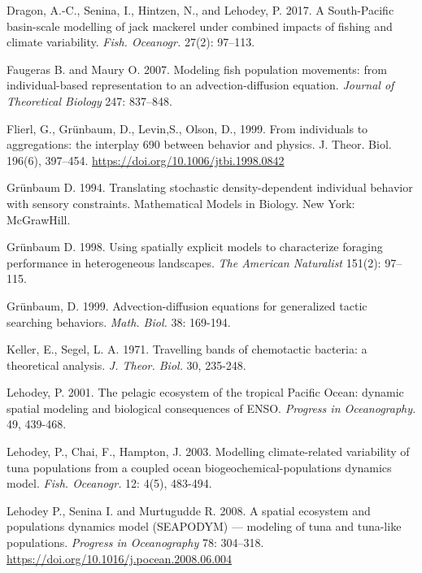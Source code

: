 \begin{thebibliography}{}
 Dragon, A.-C., Senina, I., Hintzen, N., and Lehodey, P. 2017. A South-Pacific basin-scale modelling of jack mackerel under combined impacts of fishing and climate variability. \textit{Fish. Oceanogr.} 27(2): 97–113.

 Faugeras B. and Maury O. 2007. Modeling fish population movements: from individual-based representation to an advection-diffusion equation. \textit {Journal of Theoretical Biology} 247: 837–848.

  Flierl, G., Grünbaum, D., Levin,S., Olson, D., 1999. From individuals to aggregations: the interplay 690 between behavior and physics. J. Theor. Biol. 196(6), 397–454. \url{https://doi.org/10.1006/jtbi.1998.0842}

 Grünbaum D. 1994. Translating stochastic density-dependent individual behavior with sensory constraints. Mathematical Models in Biology. New York: McGrawHill.

 Grünbaum D. 1998. Using spatially explicit models to characterize foraging performance in heterogeneous landscapes. \textit {The American Naturalist} 151(2): 97–115.

 Grünbaum, D. 1999. Advection-diffusion equations for generalized tactic searching behaviors. \textit{ Math. Biol.} 38: 169-194. 

 Keller, E., Segel, L. A. 1971. Travelling bands of chemotactic bacteria: a theoretical analysis. \textit {J. Theor. Biol.} 30, 235-248.

 Lehodey, P. 2001. The pelagic ecosystem of the tropical Pacific Ocean: dynamic spatial modeling and biological consequences of ENSO. \textit {Progress in Oceanography.} 49, 439-468.

 Lehodey, P., Chai, F., Hampton, J. 2003. Modelling climate-related variability of tuna populations from a coupled ocean biogeochemical-populations dynamics model. \textit {Fish. Oceanogr.} 12: 4(5), 483-494.

 Lehodey P., Senina I. and Murtugudde R. 2008. A spatial ecosystem and populations dynamics model (SEAPODYM) — modeling of tuna and tuna-like populations. \textit {Progress in Oceanography} 78: 304–318. \url{https://doi.org/10.1016/j.pocean.2008.06.004}


\end{thebibliography}
